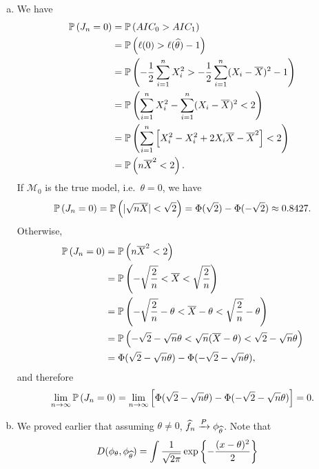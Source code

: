 \begin{ex}
  \begin{enumerate}[(a)]
    \item We have
          \begin{align*}
            \P{J_n=0}
             & =\P{AIC_0 > AIC_1}                                                           \\
             & =\P{\ell(0) > \ell(\thetahat)-1}                                             \\
             & =\P{-\frac{1}{2}\sum_{i=1}^nX_i^2 > -\frac{1}{2}\sum_{i=1}^n(X_i-\Xbar)^2-1} \\
             & =\P{\sum_{i=1}^nX_i^2-\sum_{i=1}^n(X_i-\Xbar)^2 < 2}                         \\
             & =\P{\sum_{i=1}^n\left[X_i^2-X_i^2+2X_i\Xbar-\Xbar^2 \right] < 2}             \\
             & =\P{n\Xbar^2 < 2}.
          \end{align*}
          If $\mathcal{M}_0$ is the true model, i.e.\ $\theta=0$, we have
          \[
            \P{J_n=0}
            =\P{|\sqrt{n}\Xbar| < \sqrt{2}}
            =\Phi(\sqrt{2})-\Phi(-\sqrt{2})
            \approx 0.8427.
          \]
          Otherwise,
          \begin{align*}
            \P{J_n=0}
             & =\P{n\Xbar^2 < 2}                                                                \\
             & =\P{-\sqrt{\frac{2}{n}} < \Xbar < \sqrt{\frac{2}{n}}}                            \\
             & =\P{-\sqrt{\frac{2}{n}}-\theta < \Xbar-\theta < \sqrt{\frac{2}{n}}-\theta}       \\
             & =\P{-\sqrt{2}-\sqrt{n}\theta < \sqrt{n}(\Xbar-\theta) < \sqrt{2}-\sqrt{n}\theta} \\
             & =\Phi(\sqrt{2}-\sqrt{n}\theta)-\Phi(-\sqrt{2}-\sqrt{n}\theta),
          \end{align*}
          and therefore
          \[
            \lim_{n\to\infty}\P{J_n=0}
            =\lim_{n\to\infty}\left[\Phi(\sqrt{2}-\sqrt{n}\theta)-\Phi(-\sqrt{2}-\sqrt{n}\theta)\right]
            =0.
          \]
    \item We proved earlier that assuming $\theta\neq 0$,
          $\widehat{f}_n\xrightarrow{P}\phi_{\thetahat}$. Note that
          \begin{align*}
            D(\phi_\theta, \phi_{\thetahat})
             & =\int \frac{1}{\sqrt{2\pi}}\exp\left\{-\frac{(x-\theta)^2}{2}\right\}

\end{align*}
\end{enumerate}
\end{ex}
